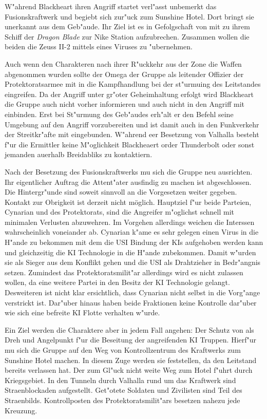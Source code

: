 W"ahrend Blackheart ihren Angriff startet verl"asst \xl{} unbemerkt das Fusionskraftwerk und begiebt sich zur"uck zum Sunshine Hotel. Dort bringt sie \ml{} unerkannt aus dem Geb"aude. Ihr Ziel ist es in Gefolgschaft von \ml{} mit zu ihrem Schiff der \emph{Dragon Blade} zur Nike Station aufzubrechen. Zusammen wollen die beiden die Zeuss II-2 mittels eines Viruses zu "ubernehmen. 

\begin{remarks}
	Auch wenn den Charakteren nach ihrer R"uckkehr aus der Zone die Waffen abgenommen wurden sollte der Omega der Gruppe als leitender Offizier der Protektoratsarmee mit in die Kampfhandlung bei der st"urmuing des Leitstandes eingreifen. Da der Angriff unter gr"o\3ter Geheimhaltung erfolgt wird Blackheart die Gruppe auch nicht vorher informieren und auch nicht in den Angriff mit einbinden. Erst bei St"urmung des Geb"audes erh"alt er den Befehl seine Umgebung auf den Angriff vorzubereiten und ist damit auch in den Funkverkehr der Streitkr"afte mit eingebunden. W"ahrend eer Besetzung von Valhalla besteht f"ur die Ermittler keine M"oglichkeit Blackheaert order
	Thunderbolt oder sonst jemanden au\3erhalb Breidabliks zu kontaktiern.
\end{remarks}


Nach der Besetzung des Fusionskraftwerks mu\3 sich die Gruppe neu ausrichten. Ihr eigentlicher Auftrag die Attent"ater ausfindig zu machen ist abgeschlossen. Die Hintergr"unde sind soweit sinnvoll an die Vorgesetzen weiter gegeben. Kontakt zur Obrigkeit ist derzeit nicht möglich. Hauptziel f"ur beide Parteien, Cynarian und des Protektorats, sind die Angreifer m"oglichst schnell mit minimalen Verlusten abzuwehren. Im Vorgehen allerdings weichen die Interssen wahrscheinlich voneiander ab. Cynarian k"ame es sehr gelegen einen Virus in die H"ande zu bekommen mit dem die USI Bindung der KIs aufgehoben werden kann und gleichzeitig die KI Technologie in die H"ande zubekommen. Damit w"urden sie als Sieger aus dem Konflikt gehen und die USI als Drahtzieher in Bedr"angnis setzen. Zumindest das Protektoratsmilit"ar allerdings wird es nicht zulassen wollen, da\3 eine weitere Partei in den Besitz der KI Technologie gelangt. Desweiteren ist nicht klar ersichtlich, dass Cynarian nicht selbst in die Vorg"ange verstrickt ist. Dar"uber hinaus haben beide Fraktionen keine Kontrolle dar"uber wie sich eine befreite KI Flotte verhalten w"urde.

Ein Ziel werden die Charaktere aber in jedem Fall angehen: Der Schutz von \ml{} als Dreh und Angelpunkt f"ur die Beseitung der angreifenden KI Truppen. Hierf"ur mu\3 sich die Gruppe auf den Weg von Kontrollzentrum des Kraftwerks zum Sunshine Hotel machen. In diesem Zuge werden sie feststellen, da\3 \xl{} den Leitstand bereits verlassen hat. Der zum Gl"uck nicht weite Weg zum Hotel f"uhrt durch Kriegsgebiet. In den Tunneln durch Valhalla rund um das Kraftwerk sind Stra\3enblockaden aufgestellt. Get"otete Soldaten und Zivilisten sind Teil des Stra\3enbilds. Kontrollposten des Protektoratsmilit"ars besetzen nahezu jede Kreuzung.

